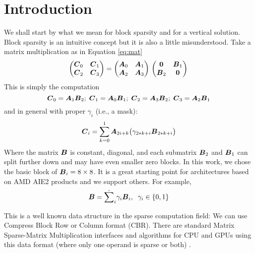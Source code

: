 \documentclass[sigconf]{acmart}
\begin{document}
\section{Introduction}
\label{sec:introduction}

We shall start by what we mean for block sparsity and for a vertical
solution. Block sparsity is an intuitive concept but it is also a
little misunderstood. Take a matrix multiplication as in Equation
\ref{eq:mat}
\begin{equation}
  \label{eq:mat}
  \begin{pmatrix}
    {\boldsymbol C}_0 & {\boldsymbol C}_1 \\
    {\boldsymbol C}_2 & {\boldsymbol C}_3 \\ 
  \end{pmatrix} = 
  \begin{pmatrix}
    {\boldsymbol A}_0 & {\boldsymbol A}_1 \\
    {\boldsymbol A}_2 & {\boldsymbol A}_3 \\ 
  \end{pmatrix}\\
  \begin{pmatrix}
    {\boldsymbol 0}   & {\boldsymbol B}_1 \\
    {\boldsymbol B}_2 & {\boldsymbol 0} \\ 
  \end{pmatrix}\\
\end{equation}
This is simply the computation
{\small \begin{equation}
  {\boldsymbol C}_0 = {\boldsymbol A}_{1} {\boldsymbol B}_{2}; \;
  {\boldsymbol C}_1 = {\boldsymbol A}_{0} {\boldsymbol B}_{1}; \;
  {\boldsymbol C}_2 = {\boldsymbol A}_{3} {\boldsymbol B}_{2}; \;
  {\boldsymbol C}_3 = {\boldsymbol A}_{2} {\boldsymbol B}_{1}
\end{equation}}
and in general with proper $\gamma_i$ (i.e., a mask):
\begin{equation}
  {\boldsymbol C}_i = \sum_{k=0}^1 {\boldsymbol A}_{2i+ k} \big(\gamma_{2*k+i} {\boldsymbol B}_{2*k+i}\big)
\end{equation}
Where the matrix ${\boldsymbol B}$ is constant, diagonal, and each submatrix
${\boldsymbol B_2}$ and ${\boldsymbol B}_1$ can split further down and may have even
smaller zero blocks. In this work, we chose the basic block of
${\boldsymbol B}_i = 8\times 8$. It is a great starting point for architectures
based on AMD AIE2 products and we support others.  For example,
\begin{equation}
  {\boldsymbol B} = \dot{\sum}_i \gamma_i {\boldsymbol B}_i, \;\; \gamma_i \in \{0,1\} 
\end{equation}

This is a well known data structure in the sparse computation field:
We can use Compress Block Row or Column format (CBR). There are
standard Matrix Sparse-Matrix Multiplication interfaces and algorithms
for CPU and GPUs using this data format (where only one operand is
sparse or both) \cite{rocSPARSE,cuSPARSE}.
\end{document}
